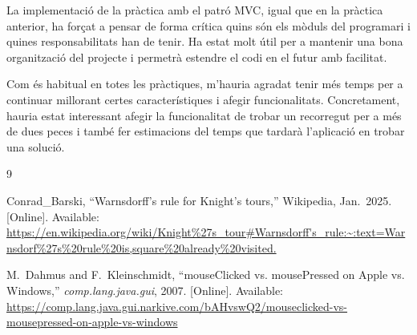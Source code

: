 \documentclass[conference,compsoc]{IEEEtran}
\begin{document}
La implementació de la pràctica amb el patró MVC, igual que en la pràctica anterior, ha forçat a
pensar de forma crítica quins són els mòduls del programari i quines responsabilitats han de tenir.
Ha estat molt útil per a mantenir una bona organització del projecte i permetrà estendre el codi en el futur
amb facilitat.

Com és habitual en totes les pràctiques, m'hauria agradat tenir més temps per a continuar millorant certes
característiques i afegir funcionalitats. Concretament, hauria estat interessant afegir la funcionalitat de
trobar un recorregut per a més de dues peces i també fer estimacions del temps que tardarà l'aplicació
en trobar una solució.


\begin{thebibliography}{9}

Conrad\_Barski, ``Warnsdorff's rule for Knight's tours,''
Wikipedia, Jan.\ 2025. [Online]. Available:
\url{https://en.wikipedia.org/wiki/Knight%27s_tour#Warnsdorff's_rule:~:text=Warnsdorf%27s%20rule%20is,square%20already%20visited.}

M.~Dahmus and F.~Kleinschmidt, ``mouseClicked vs. mousePressed on Apple vs. Windows,''
\textit{comp.lang.java.gui}, 2007. [Online]. Available:
\url{https://comp.lang.java.gui.narkive.com/bAHvswQ2/mouseclicked-vs-mousepressed-on-apple-vs-windows}

\end{thebibliography}
\end{document}
